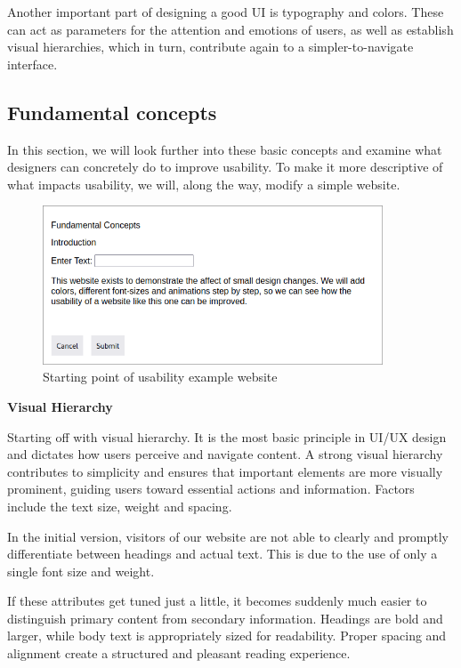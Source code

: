 \blankLine

Another important part of designing a good UI is typography and colors. These
can act as parameters for the attention and emotions of users, as well as establish visual hierarchies, which in turn, contribute again to a simpler-to-navigate interface. \autocite{Paul:UIUXIntroduction}

\subsection{Fundamental concepts}
In this section, we will look further into these basic concepts and examine what designers can concretely do to improve usability. To make it more descriptive of what impacts usability, we will, along the way, modify a simple website.

\blankLine

\begin{figure} [H]
    \center
    \includegraphics [width=0.9\textwidth] {images/paul/usabilityExamples/initialWebsite.png}
    \caption{Starting point of usability example website}
\end{figure}

\textbf{Visual Hierarchy}

Starting off with visual hierarchy. It is the most basic principle in UI/UX design and dictates how users perceive and navigate content. A strong visual hierarchy contributes to simplicity and ensures that important elements are more visually prominent, guiding users toward essential actions and information. Factors include the text size, weight and spacing. 

\blankLine

In the initial version, visitors of our website are not able to clearly and promptly differentiate between headings and actual text. This is due to the use of only a single font size and weight.


\blankLine

    If these attributes get tuned just a little, it becomes suddenly much easier to distinguish primary content from secondary information. Headings are bold and larger, while body text is appropriately sized for readability. Proper spacing and alignment create a structured and pleasant reading experience.
    
